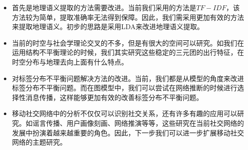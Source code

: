 \begin{itemize}
    \item 首先是地理语义提取的方法需要改进。当前我们采用的方法是$TF-IDF$，该方法较为简单，提取准确率无法得到保障。因此，我们需采用更加有效的方法来提取地理语义。初步的思路是采用LDA来改进地理语义提取。\\
    \item 当前的时空与社会学理论交叉的不多，但是有很大的空间可以研究。如我们在运用结构不平衡理论的时候，我们其实研究这些稳定的三元团的出行特征，在时空分布与地理去向上面有什么特点。 \\
    \item 对标签分布不平衡问题解决方法的改进。当前，我们都是从模型的角度来改进标签分布不平衡问题。而在图模型中，我们可以尝试在网络推断的时候进行选择性消息传播，这样能够更加有效的改善标签分布不平衡问题。 \\
    \item 移动社交网络中的分析不仅仅可以识别社交关系，还有许多有趣的应用可以研究。如谣言传播、用户画像刻画、网络推演等等，这些研究在当前社交网络的发展中扮演着越来越重要的角色。因此，下一步我们可以进一步扩展移动社交网络的主题研究。\\
\end{itemize}





































